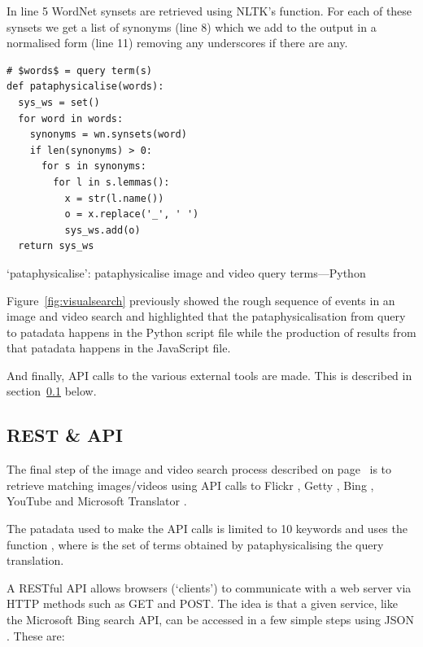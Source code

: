 In line 5 WordNet synsets are retrieved using \ac{NLTK}'s  function. For each of these synsets we get a list of synonyms (line 8) which we add to the output in a normalised form (line 11) removing any underscores if there are any.

\begin{listing}[!htbp] %
  \begin{verbatim}
# $words$ = query term(s)
def pataphysicalise(words):
  sys_ws = set()
  for word in words:
    synonyms = wn.synsets(word)
    if len(synonyms) > 0:
      for s in synonyms:
        for l in s.lemmas():
          x = str(l.name())
          o = x.replace('_', ' ')
          sys_ws.add(o)
  return sys_ws
  \end{verbatim}
\caption[`pataphysicalise' function---Python]{`pataphysicalise': pataphysicalise image and video query terms---Python}
\label{code:pataph}
\end{listing}

Figure~\ref{fig:visualsearch} previously showed the rough sequence of events in an image and video search and highlighted that the pataphysicalisation from query to patadata happens in the  Python script file while the production of results from that patadata happens in the  JavaScript file.

And finally, \ac{API} calls to the various external tools are made. This is described in section~\ref{s:api} below.


\subsection{REST \& API}
\label{s:api}

The final step of the image and video search process described on page~\pageref{s:imgvid} is to retrieve matching images/videos using \ac{API} calls to Flickr \autocite{FlickrAPI,FlickrGuideAPI}, Getty \autocite{GettyAPI,GettyOverviewAPI}, Bing \autocite{BingAPI,BingAzureAPI}, YouTube \autocite{YouTubeAPI} and Microsoft Translator \autocite{TranslatorAPI}.

The patadata used to make the \ac{API} calls is limited to 10 keywords and uses the function , where  is the set of terms obtained by pataphysicalising the query translation.

A \acs{REST}ful \ac{API} allows browsers (`clients') to communicate with a web server via \acs{HTTP} methods such as GET and POST. The idea is that a given service, like the Microsoft Bing search \ac{API}, can be accessed in a few simple steps using  \ac{JSON} \autocite{JSON2016}. These are:

